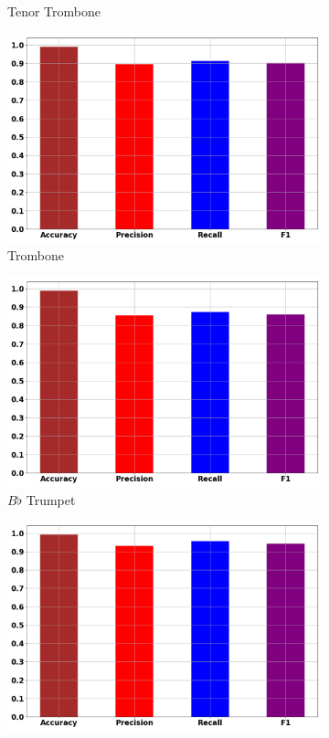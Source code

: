 \documentclass[12pt,letterpaper]{article}
\begin{document}
\begin{figure}[H]
\begin{subfigure}[b]{0.45\textwidth}
	\caption{Tenor Trombone}
	\end{subfigure}	
	\begin{subfigure}[b]{0.45\textwidth}
	\centering
	\includegraphics[width=\textwidth]{../FiguresClasses/Trombone}
	\caption{Trombone}
	\end{subfigure}	
	\begin{subfigure}[b]{0.45\textwidth}
	\centering
	\includegraphics[width=\textwidth]{../FiguresClasses/Trumpet}
	\caption{$B\flat$ Trumpet}
	\end{subfigure}
	\begin{subfigure}[b]{0.45\textwidth}
	\centering
	\includegraphics[width=\textwidth]{../FiguresClasses/Tuba}

\end{subfigure}
\end{figure}
\end{document}
